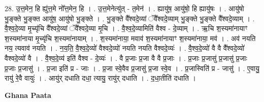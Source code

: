 \documentclass[17pt]{extarticle}
\begin{document}
28. उ॒त्त॒मेन॒ हि ह्यु॑त्त॒मे नो᳚त्त॒मेन॒ हि । . उ॒त्त॒मेनेत्यु॑त् - त॒मेन॑ । . ह्यायु॑ष॒ आयु॑षो॒ हि ह्यायु॑षः । . आयु॑षो भु॒ङ्क्ते भु॒ङ्क्त आयु॑ष॒ आयु॑षो भु॒ङ्क्ते । . भु॒ङ्क्ते वै᳚श्वदे॒व्यां ॅवै᳚श्वदे॒व्याम् भु॒ङ्क्ते भु॒ङ्क्ते वै᳚श्वदे॒व्याम् । . वै॒श्व॒दे॒व्या मृ॒च्यृ॑चि वै᳚श्वदे॒व्यां ॅवै᳚श्वदे॒व्या मृ॒चि । . वै॒श्व॒दे॒व्यामिति॑ वैश्व - दे॒व्याम् । . ऋ॒चि श॒स्यमा॑नायाꣳ श॒स्यमा॑नाया मृ॒च्यृ॑चि श॒स्यमा॑नायाम् । . श॒स्यमा॑नाया॒ मवाव॑ श॒स्यमा॑नायाꣳ श॒स्यमा॑नाया॒ मव॑ । . अव॑ नयति नय॒ त्यवाव॑ नयति । . न॒य॒ति॒ वै॒श्व॒दे॒व्यो॑ वैश्वदे॒व्यो॑ नयति नयति वैश्वदे॒व्यः॑ । . वै॒श्व॒दे॒व्यो॑ वै वै वै᳚श्वदे॒व्यो॑ वैश्वदे॒व्यो॑ वै । . वै॒श्व॒दे॒व्य॑ इति॑ वैश्व - दे॒व्यः॑ । . वै प्र॒जाः प्र॒जा वै वै प्र॒जाः । . प्र॒जाः प्र॒जासु॑ प्र॒जासु॑ प्र॒जाः प्र॒जाः प्र॒जासु॑ । . प्र॒जा इति॑ प्र - जाः । . प्र॒जा स्वे॒वैव प्र॒जासु॑ प्र॒जा स्वे॒व । . प्र॒जास्विति॑ प्र - जासु॑ । . ए॒वायु॒ रायु॑ रे॒वै वायुः॑ । . आयु॑र् दधाति दधा॒ त्यायु॒ रायु॑र् दधाति । . द॒धा॒तीति॑ दधाति । \newline

\textbf{Ghana Paata } \newline
\end{document}
